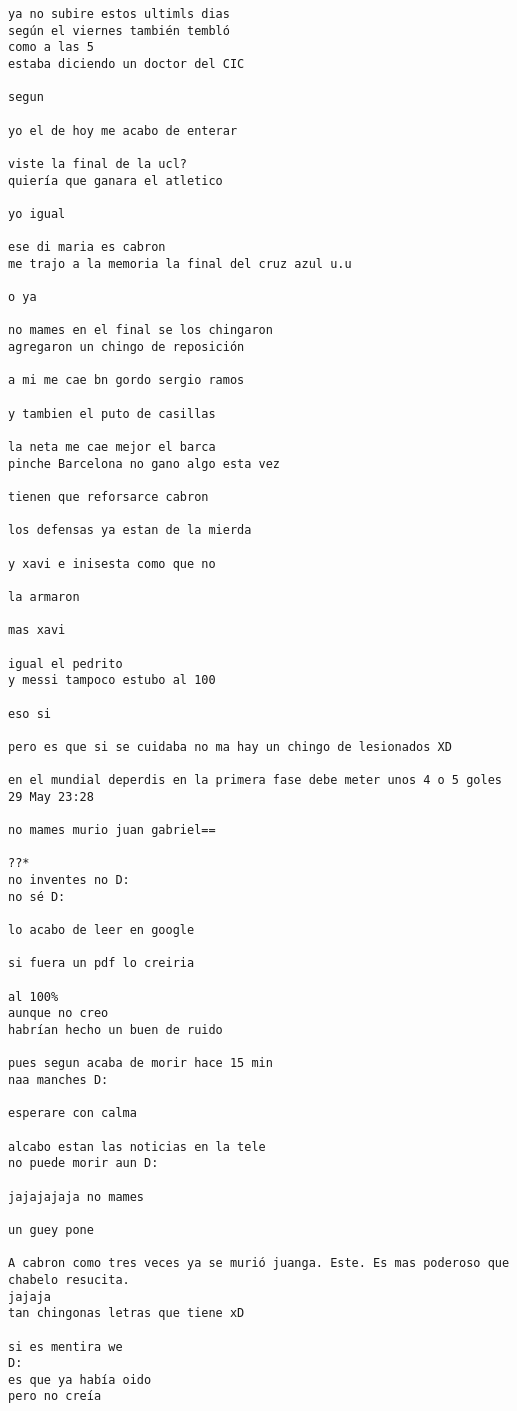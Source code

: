 \begin{verbatim}
ya no subire estos ultimls dias
según el viernes también tembló
como a las 5
estaba diciendo un doctor del CIC

segun

yo el de hoy me acabo de enterar

viste la final de la ucl?
quiería que ganara el atletico

yo igual

ese di maria es cabron
me trajo a la memoria la final del cruz azul u.u

o ya

no mames en el final se los chingaron
agregaron un chingo de reposición

a mi me cae bn gordo sergio ramos

y tambien el puto de casillas

la neta me cae mejor el barca
pinche Barcelona no gano algo esta vez 

tienen que reforsarce cabron

los defensas ya estan de la mierda

y xavi e inisesta como que no

la armaron

mas xavi

igual el pedrito
y messi tampoco estubo al 100

eso si

pero es que si se cuidaba no ma hay un chingo de lesionados XD

en el mundial deperdis en la primera fase debe meter unos 4 o 5 goles
29 May 23:28

no mames murio juan gabriel==

??*
no inventes no D:
no sé D:

lo acabo de leer en google

si fuera un pdf lo creiria

al 100%
aunque no creo
habrían hecho un buen de ruido

pues segun acaba de morir hace 15 min
naa manches D:

esperare con calma

alcabo estan las noticias en la tele
no puede morir aun D:

jajajajaja no mames

un guey pone

A cabron como tres veces ya se murió juanga. Este. Es mas poderoso que chabelo resucita.
jajaja
tan chingonas letras que tiene xD

si es mentira we
D:
es que ya había oido
pero no creía


\end{verbatim}
